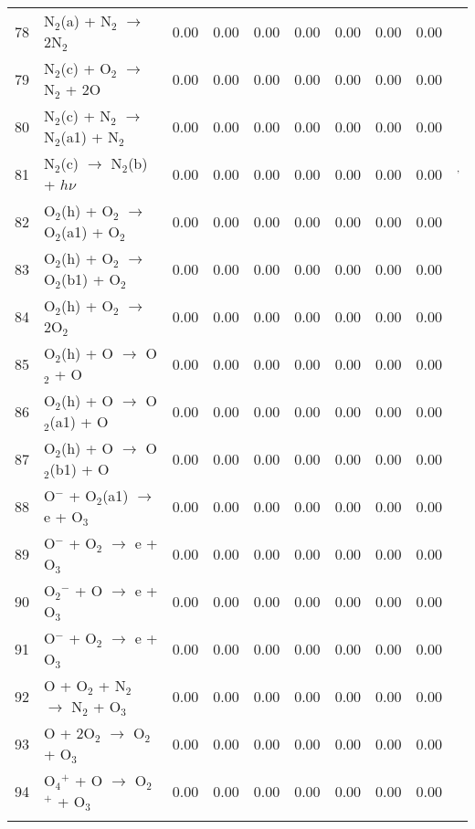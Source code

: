 \documentclass{article}
\begin{document}
\begin{table}[H]
{\begin{tabu}{clcccccccc}
      78 & N$_{2}$(a) + N$_{2}$ $\rightarrow$ 2N$_{2}$ & 0.00 & 0.00 & 0.00 & 0.00 & 0.00 & 0.00 & 0.00 &  \footnotemark[7]\\
      79 & N$_{2}$(c) + O$_{2}$ $\rightarrow$ N$_{2}$ + 2O & 0.00 & 0.00 & 0.00 & 0.00 & 0.00 & 0.00 & 0.00 &  \footnotemark[9]\\
      80 & N$_{2}$(c) + N$_{2}$ $\rightarrow$ N$_{2}$(a1) + N$_{2}$ & 0.00 & 0.00 & 0.00 & 0.00 & 0.00 & 0.00 & 0.00 &  \footnotemark[9]\\
      81 & N$_{2}$(c) $\rightarrow$ N$_{2}$(b) + $h\nu$ & 0.00 & 0.00 & 0.00 & 0.00 & 0.00 & 0.00 & 0.00 &  \footnotemark[5]$^{,}$\footnotemark[9]\\
      82 & O$_{2}$(h) + O$_{2}$ $\rightarrow$ O$_{2}$(a1) + O$_{2}$ & 0.00 & 0.00 & 0.00 & 0.00 & 0.00 & 0.00 & 0.00 &  \\
      83 & O$_{2}$(h) + O$_{2}$ $\rightarrow$ O$_{2}$(b1) + O$_{2}$ & 0.00 & 0.00 & 0.00 & 0.00 & 0.00 & 0.00 & 0.00 &  \\
      84 & O$_{2}$(h) + O$_{2}$ $\rightarrow$ 2O$_{2}$ & 0.00 & 0.00 & 0.00 & 0.00 & 0.00 & 0.00 & 0.00 &  \\
      85 & O$_{2}$(h) + O $\rightarrow$ O$_{2}$ + O & 0.00 & 0.00 & 0.00 & 0.00 & 0.00 & 0.00 & 0.00 &  \\
      86 & O$_{2}$(h) + O $\rightarrow$ O$_{2}$(a1) + O & 0.00 & 0.00 & 0.00 & 0.00 & 0.00 & 0.00 & 0.00 &  \\
      87 & O$_{2}$(h) + O $\rightarrow$ O$_{2}$(b1) + O & 0.00 & 0.00 & 0.00 & 0.00 & 0.00 & 0.00 & 0.00 &  \\
      88 & O$^{-}$ + O$_{2}$(a1) $\rightarrow$ e + O$_{3}$ & 0.00 & 0.00 & 0.00 & 0.00 & 0.00 & 0.00 & 0.00 &  \\
      89 & O$^{-}$ + O$_{2}$ $\rightarrow$ e + O$_{3}$ & 0.00 & 0.00 & 0.00 & 0.00 & 0.00 & 0.00 & 0.00 &  \\
      90 & O$_{2}$$^{-}$ + O $\rightarrow$ e + O$_{3}$ & 0.00 & 0.00 & 0.00 & 0.00 & 0.00 & 0.00 & 0.00 &  \\
      91 & O$^{-}$ + O$_{2}$ $\rightarrow$ e + O$_{3}$ & 0.00 & 0.00 & 0.00 & 0.00 & 0.00 & 0.00 & 0.00 &  \\
      92 & O + O$_{2}$ + N$_{2}$ $\rightarrow$ N$_{2}$ + O$_{3}$ & 0.00 & 0.00 & 0.00 & 0.00 & 0.00 & 0.00 & 0.00 &  \\
      93 & O + 2O$_{2}$ $\rightarrow$ O$_{2}$ + O$_{3}$ & 0.00 & 0.00 & 0.00 & 0.00 & 0.00 & 0.00 & 0.00 &  \\
      94 & O$_{4}$$^{+}$ + O $\rightarrow$ O$_{2}$$^{+}$ + O$_{3}$ & 0.00 & 0.00 & 0.00 & 0.00 & 0.00 & 0.00 & 0.00 &  \\
$$
\end{tabu}}
\end{table}
\end{document}
